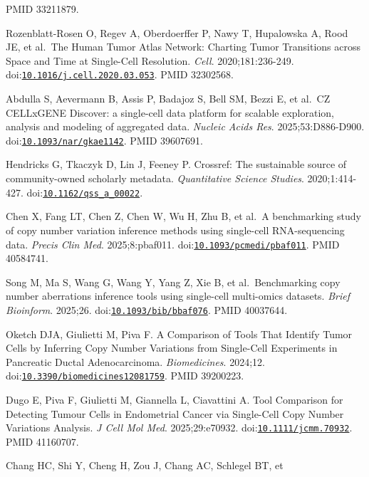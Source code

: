 \documentclass[11pt]{article}
\begin{document}
\begin{enumerate}[label={[\arabic*]},leftmargin=2.6em,labelsep=0.5em,itemsep=1.5pt]
  PMID 33211879.
\item
  Rozenblatt-Rosen O, Regev A, Oberdoerffer P, Nawy T, Hupalowska A,
  Rood JE, et al.~The Human Tumor Atlas Network: Charting Tumor
  Transitions across Space and Time at Single-Cell Resolution.
  \emph{Cell}. 2020;181:236-249.
  doi:\href{https://doi.org/10.1016/j.cell.2020.03.053}{\nolinkurl{10.1016/j.cell.2020.03.053}}.
  PMID 32302568.
\item
  Abdulla S, Aevermann B, Assis P, Badajoz S, Bell SM, Bezzi E, et
  al.~CZ CELLxGENE Discover: a single-cell data platform for scalable
  exploration, analysis and modeling of aggregated data. \emph{Nucleic
  Acids Res}. 2025;53:D886-D900.
  doi:\href{https://doi.org/10.1093/nar/gkae1142}{\nolinkurl{10.1093/nar/gkae1142}}.
  PMID 39607691.
\item
  Hendricks G, Tkaczyk D, Lin J, Feeney P. Crossref: The sustainable
  source of community-owned scholarly metadata. \emph{Quantitative
  Science Studies}. 2020;1:414-427.
  doi:\href{https://doi.org/10.1162/qss_a_00022}{\nolinkurl{10.1162/qss\_a\_00022}}.
\item
  Chen X, Fang LT, Chen Z, Chen W, Wu H, Zhu B, et al.~A benchmarking
  study of copy number variation inference methods using single-cell
  RNA-sequencing data. \emph{Precis Clin Med}. 2025;8:pbaf011.
  doi:\href{https://doi.org/10.1093/pcmedi/pbaf011}{\nolinkurl{10.1093/pcmedi/pbaf011}}.
  PMID 40584741.
\item
  Song M, Ma S, Wang G, Wang Y, Yang Z, Xie B, et al.~Benchmarking copy
  number aberrations inference tools using single-cell multi-omics
  datasets. \emph{Brief Bioinform}. 2025;26.
  doi:\href{https://doi.org/10.1093/bib/bbaf076}{\nolinkurl{10.1093/bib/bbaf076}}.
  PMID 40037644.
\item
  Oketch DJA, Giulietti M, Piva F. A Comparison of Tools That Identify
  Tumor Cells by Inferring Copy Number Variations from Single-Cell
  Experiments in Pancreatic Ductal Adenocarcinoma. \emph{Biomedicines}.
  2024;12.
  doi:\href{https://doi.org/10.3390/biomedicines12081759}{\nolinkurl{10.3390/biomedicines12081759}}.
  PMID 39200223.
\item
  Dugo E, Piva F, Giulietti M, Giannella L, Ciavattini A. Tool
  Comparison for Detecting Tumour Cells in Endometrial Cancer via
  Single-Cell Copy Number Variations Analysis. \emph{J Cell Mol Med}.
  2025;29:e70932.
  doi:\href{https://doi.org/10.1111/jcmm.70932}{\nolinkurl{10.1111/jcmm.70932}}.
  PMID 41160707.
\item
  Chang HC, Shi Y, Cheng H, Zou J, Chang AC, Schlegel BT, et

\end{enumerate}
\end{document}
